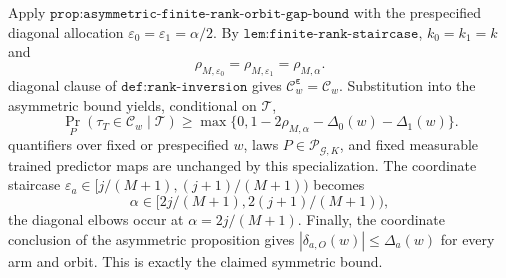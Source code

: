 Apply \(\texttt{prop:asymmetric-finite-rank-orbit-gap-bound}\) with the prespecified diagonal allocation \(\varepsilon_0=\varepsilon_1=\alpha/2\). By \(\texttt{lem:finite-rank-staircase}\), \(k_0=k_1=k\) and\n\[\rho_{M,\varepsilon_0}=\rho_{M,\varepsilon_1}=\rho_{M,\alpha}.\]\nThe diagonal clause of \(\texttt{def:rank-inversion}\) gives \(\mathcal C^{\boldsymbol\varepsilon}_w=\mathcal C_w\). Substitution into the asymmetric bound yields, conditional on \(\mathcal T\),\n\[\Pr_P(\tau_T\in\mathcal C_w\mid\mathcal T)\ge\max\{0,1-2\rho_{M,\alpha}-\Delta_0(w)-\Delta_1(w)\}.\]\nThe quantifiers over fixed or prespecified \(w\), laws \(P\in\mathcal P_{\mathcal G,K}\), and fixed measurable trained predictor maps are unchanged by this specialization. The coordinate staircase \(\varepsilon_a\in[j/(M+1),(j+1)/(M+1))\) becomes\n\[\alpha\in[2j/(M+1),2(j+1)/(M+1)),\]\nso the diagonal elbows occur at \(\alpha=2j/(M+1)\). Finally, the coordinate conclusion of the asymmetric proposition gives \(|\delta_{a,O}(w)|\le\Delta_a(w)\) for every arm and orbit. This is exactly the claimed symmetric bound.